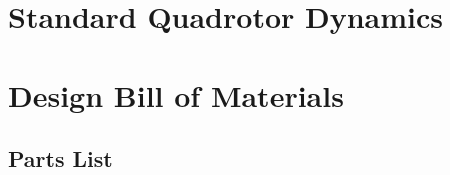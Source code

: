\appendix
\chapter{Standard Quadrotor Dynamics}
\label{app:stddynamics}

\chapter{Design Bill of Materials}
\label{app:bom}
\section{Parts List}
